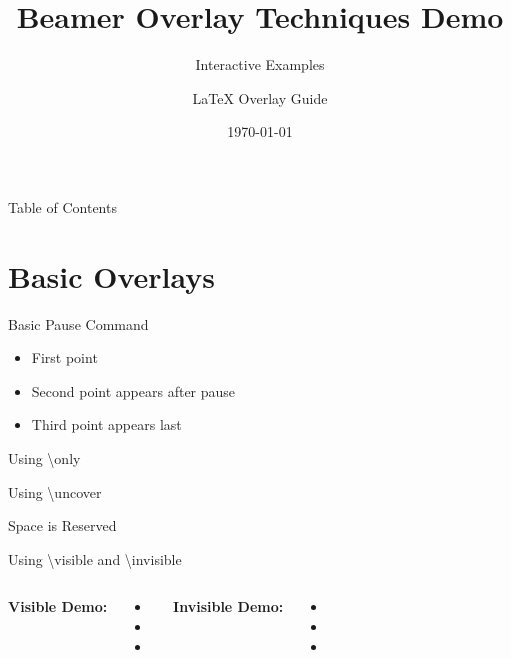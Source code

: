 \documentclass{beamer}
\title{Beamer Overlay Techniques Demo}
\subtitle{Interactive Examples}
\author{LaTeX Overlay Guide}
\date{\today}
\begin{document}
\begin{frame}
    \titlepage
\end{frame}

\begin{frame}{Table of Contents}
    \tableofcontents
\end{frame}

\section{Basic Overlays}

\begin{frame}{Basic Pause Command}
    \begin{itemize}
        \item First point
        \pause
        \item Second point appears after pause
        \pause
        \item Third point appears last
    \end{itemize}
\end{frame}

\begin{frame}{Using \textbackslash only}
\end{frame}

\begin{frame}{Using \textbackslash uncover}
    \begin{block}{Space is Reserved}
        
        
        
    \end{block}
\end{frame}

\begin{frame}{Using \textbackslash visible and \textbackslash invisible}
    \begin{columns}
        \textbf{Visible Demo:}
        \begin{itemize}
            \item {}
            \item {}
            \item {}
        \end{itemize}
        
        \textbf{Invisible Demo:}
        \begin{itemize}
            \item {}
            \item {}
            \item {}
        \end{itemize}
    \end{columns}
\end{frame}
\end{document}

